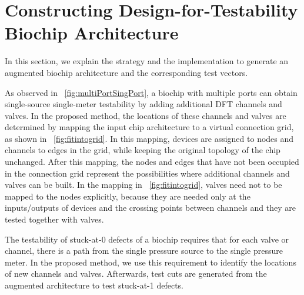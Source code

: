 \section{Constructing Design-for-Testability Biochip Architecture}\label{sec:dft_arch}

In this section, we explain the strategy and the implementation to generate an 
augmented biochip architecture and the corresponding test vectors.

As observed in \figname~\ref{fig:multiPortSingPort}, a biochip with multiple
ports can obtain single-source single-meter testability by adding additional
DFT channels and valves.  In the proposed method, the locations of these
channels and valves are determined by mapping the input chip architecture to a
virtual connection grid, as shown in \figname~\ref{fig:fitintogrid}. In this
mapping, devices are assigned to nodes and channels to edges in the
grid, while keeping the original topology of the chip unchanged.  After this
mapping, the nodes and edges that have not been occupied in the connection
grid represent the possibilities where additional channels and valves can be
built. 
In the mapping in \figname~\ref{fig:fitintogrid}, valves need not to be mapped
to the nodes explicitly,
because they are needed only at the inputs/outputs of devices and the crossing
points between channels and they are tested together with valves.


The 
testability of stuck-at-0 defects of a biochip requires that for each valve or
channel, there is a path from the single pressure source to the single
pressure meter.  In the proposed method, we use this requirement to identify
the locations of new channels and valves. Afterwards, test cuts are
generated from the augmented architecture to test stuck-at-1 defects.

